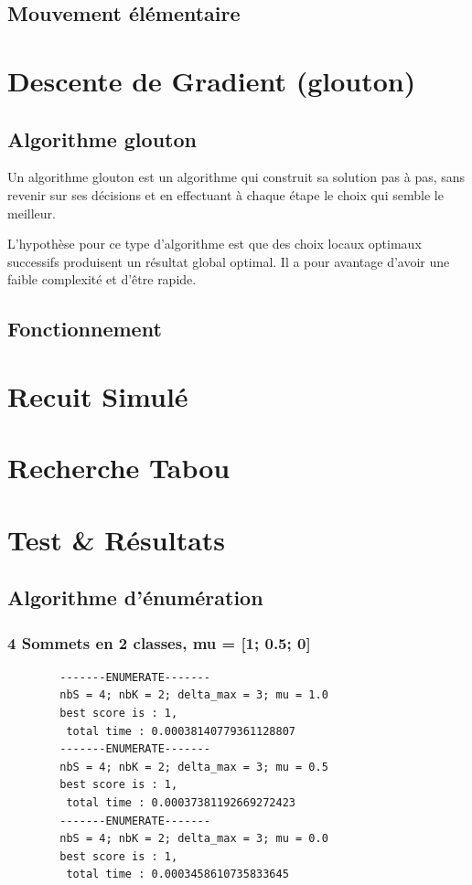 \documentclass[a4paper]{article}
\begin{document}
	\subsection{Mouvement élémentaire}

\section{Descente de Gradient (glouton)}
	\subsection{Algorithme glouton}
	Un algorithme glouton est un algorithme qui construit sa solution pas à pas, sans revenir sur ses décisions et en effectuant à chaque étape le choix qui semble le meilleur.

	L'hypothèse pour ce type d'algorithme est que des choix locaux optimaux successifs produisent un résultat global optimal. Il a pour avantage d'avoir une faible complexité et d'être rapide.

	\subsection{Fonctionnement}
	

\section{Recuit Simulé}

\section{Recherche Tabou}

\section{Test \& Résultats}

	\subsection{Algorithme d'énumération}
		\subsubsection{4 Sommets en 2 classes, mu = [1; 0.5; 0]}
		\begin{verbatim}
		-------ENUMERATE-------
		nbS = 4; nbK = 2; delta_max = 3; mu = 1.0
		best score is : 1,
		 total time : 0.00038140779361128807
		-------ENUMERATE-------
		nbS = 4; nbK = 2; delta_max = 3; mu = 0.5
		best score is : 1,
		 total time : 0.00037381192669272423
		-------ENUMERATE-------
		nbS = 4; nbK = 2; delta_max = 3; mu = 0.0
		best score is : 1,
		 total time : 0.0003458610735833645
		\end{verbatim}
\end{document}
